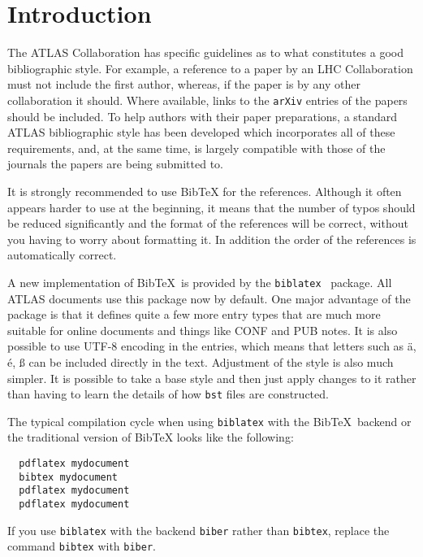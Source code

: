 \documentclass[UKenglish]{latex/atlasdoc}
\author{Ian C. Brock}
\affil{University of Bonn}
\newcommand*{\BibTeX}{Bib\TeX}
\newcommand{\Package}[1]{\texttt{#1}\xspace}
\begin{document}
 


\section{Introduction}

The ATLAS Collaboration has specific guidelines as to what constitutes a good bibliographic style. 
For example, a reference to a paper by an LHC Collaboration must not include the first author,
whereas, if the paper is by any other collaboration it should. 
Where available, links to the \texttt{arXiv} entries of the papers should be included. 
To help authors with their paper preparations,
a standard ATLAS bibliographic style has been developed which incorporates all of these requirements, 
and, at the same time, is largely compatible with those of the journals the papers are being submitted to. 

It is strongly recommended to use \BibTeX{} for the references. 
Although it often appears harder to use at the beginning, it means that the number of
typos should be reduced significantly and the format of the references
will be correct, without you having to worry about formatting it.
In addition the order of the references is automatically correct.

A new implementation of \BibTeX\ is provided by the \texttt{biblatex}~\cite{biblatex} package.
All ATLAS documents use this package now by default.
One major advantage of the package is that it defines quite a few more entry types
that are much more suitable for online documents and things like CONF and PUB notes.
It is also possible to use UTF-8 encoding in the entries, which means that letters such as
ä, é, ß can be included directly in the text.
Adjustment of the style is also much simpler.
It is possible to take a base style and then just apply changes to it rather than
having to learn the details of how \texttt{bst} files are constructed.

The typical compilation cycle when using \Package{biblatex} with the \BibTeX\ backend 
or the traditional version of \BibTeX{} looks like the following:
%
\begin{verbatim}
  pdflatex mydocument
  bibtex mydocument
  pdflatex mydocument
  pdflatex mydocument
\end{verbatim}
If you use \Package{biblatex} with the backend \Package{biber} rather than \Package{bibtex}, replace the command
\texttt{bibtex} with \texttt{biber}.
\end{document}
